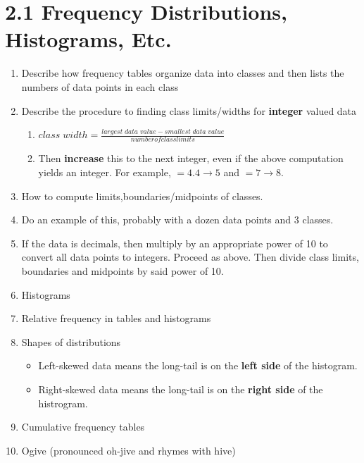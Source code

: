 \documentclass{article}
\begin{document}
\section*{2.1 Frequency Distributions, Histograms, Etc.}

\begin{enumerate}

    \item Describe how frequency tables organize data into classes and then lists the numbers of data points in each class
    
    \item Describe the procedure to finding class limits/widths for {\bf integer} valued data
    
        \begin{enumerate}
        
            \item $\displaystyle{class\;width = \frac{largest\;data\;value - smallest\;data\;value}{number of class limits}}$
            
            \item Then {\bf increase} this to the next integer, even if the above computation yields an integer. For example, $=4.4\rightarrow 5$ and $=7 \rightarrow 8$.
            
        \end{enumerate}
        
    \item How to compute limits,boundaries/midpoints of classes.
    
    \item Do an example of this, probably with a dozen data points and 3 classes.
    
    \item If the data is decimals, then multiply by an appropriate power of 10 to convert all data points to integers. Proceed as above. Then divide class limits, boundaries and midpoints by said power of 10.
    
    \item Histograms
    
    \item Relative frequency in tables and histograms
    
    \item Shapes of distributions
    
        \begin{itemize}
        
            \item Left-skewed data means the long-tail is on the {\bf left side} of the histogram.
            
            \item Right-skewed data means the long-tail is on the {\bf right side} of the histrogram.
            
        \end{itemize}
    
    \item Cumulative frequency tables
    
    \item Ogive (pronounced oh-jive and rhymes with hive)
    
\end{enumerate}
\end{document}
